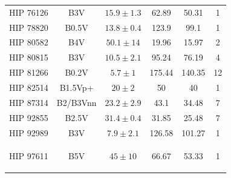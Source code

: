 {\begin{small}
\begin{longtable}{|cccccc|}
        HIP 76126 & B3V &$ 15.9 \pm 1.3 $& 62.89 & 50.31 & 1 \\ 
        HIP 78820 & B0.5V & $13.8 \pm 0.4$ & 123.9 & 99.1 & 1 \\
        HIP 80582 & B4V &$ 50.1 \pm 14 $& 19.96 & 15.97 & 2 \\ 
        HIP 80815 & B3V &$ 10.5 \pm 2.1 $& 95.24 & 76.19 & 4 \\ 
        HIP 81266 & B0.2V &$ 5.7 \pm 1 $& 175.44 & 140.35 & 12 \\ 
        HIP 82514 & B1.5Vp+ &$ 20 \pm 2 $& 50 & 40 & 1 \\ 
        HIP 87314 & B2/B3Vnn &$ 23.2 \pm 2.9 $& 43.1 & 34.48 & 7 \\ 
        HIP 92855 & B2.5V &$ 31.4 \pm 0.4 $& 31.85 & 25.48 & 7 \\ 
        HIP 92989 & B3V &$ 7.9 \pm 2.1 $& 126.58 & 101.27 & 1 \\ 
        HIP 97611 & B5V &$ 45 \pm 10 $& 66.67 & 53.33 & 1        

        \label{paper1_tab:sample}
\end{longtable}
\end{small}
}

